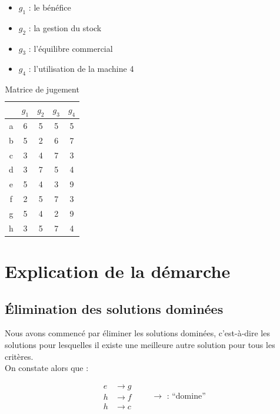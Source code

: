 \documentclass[paper=a4, fontsize=11pt]{report}
\numberwithin{equation}{section}		%
\numberwithin{figure}{section}			%
\numberwithin{table}{section}				%
\begin{document}
\begin{multicols}{2}

\begin{itemize}
\item $g_1$ : le bénéfice
\item $g_2$ : la gestion du stock
\item $g_3$ : l'équilibre commercial
\item $g_4$ : l'utilisation de la machine 4
\end{itemize}


\begin{table}[H]
\begin{center}
\begin{tabular}{c|cccc}
 & $g_1$ & $g_2$ & $g_3$ & $g_4$ \\ 
\hline 
a & 6 & 5 & 5 & 5 \\ 
b & 5 & 2 & 6 & 7 \\ 
c & 3 & 4 & 7 & 3 \\ 
d & 3 & 7 & 5 & 4 \\ 
e & 5 & 4 & 3 & 9 \\ 
f & 2 & 5 & 7 & 3 \\ 
g & 5 & 4 & 2 & 9 \\ 
h & 3 & 5 & 7 & 4 \\ 
\end{tabular}
\caption{Matrice de jugement} 
\end{center}
\end{table}

\end{multicols}

\section{Explication de la démarche}

\subsection{Élimination des solutions dominées}

Nous avons commencé par éliminer les solutions dominées, c’est-à-dire les solutions pour lesquelles il existe une meilleure autre solution pour tous les critères.\\

On constate alors que :

\begin{equation*}
  \left.
    \begin{aligned}
	e & \rightarrow g \\
 h & \rightarrow f \\
 h & \rightarrow c 
    \end{aligned}
  \right. \quad \quad \rightarrow \text{ : “domine”}
\end{equation*}
\end{document}
